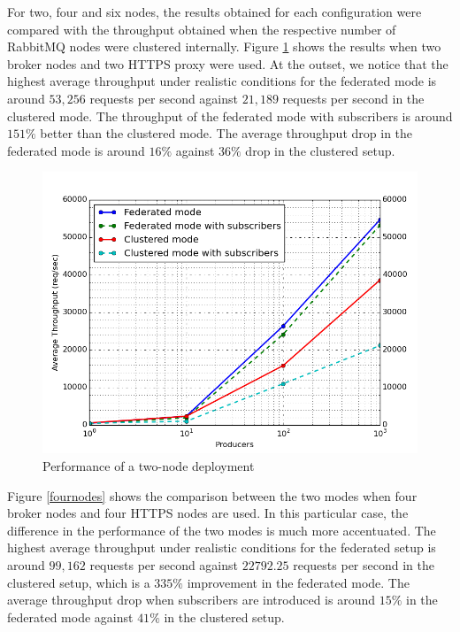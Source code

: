 \documentclass[conference, 10pt]{IEEEtran}
\begin{document}
For two, four and six nodes, the results obtained for each configuration were compared with the throughput obtained when the respective number of RabbitMQ nodes were clustered internally. Figure \ref{twonodes} shows the results when two broker nodes and two HTTPS proxy were used. At the outset, we notice that the highest average throughput under realistic conditions for the federated mode is around $53,256$ requests per second against $21,189$ requests per second in the clustered mode. The throughput of the federated mode with subscribers is around $151\%$ better than the clustered mode. The average throughput drop in the federated mode is around $16\%$ against $36\%$ drop in the clustered setup.  

\begin{figure}
 \includegraphics[width=\linewidth, height=\linewidth, keepaspectratio]{2-nodes.png}
\caption{Performance of a two-node deployment}
\label{twonodes}
\end{figure}

Figure \ref{fournodes} shows the comparison between the two modes when four broker nodes and four HTTPS nodes are used. In this particular case, the difference in the performance of the two modes is much more accentuated. The highest average throughput under realistic conditions for the federated setup is around $99,162$ requests per second against $22792.25$ requests per second in the clustered setup, which is a $335\%$ improvement in the federated mode. The average throughput drop when subscribers are introduced is around $15\%$ in the federated mode against $41\%$ in the clustered setup.  
\end{document}
